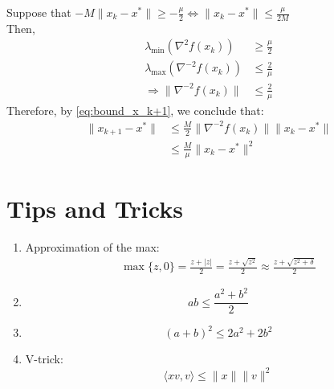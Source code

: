 \documentclass[12pt, openany]{report}
\theoremstyle{definition}
\begin{document}
Suppose that $-M \|x_k-x^*\| \geq - \frac{\mu}{2} \Leftrightarrow \|x_k-x^*\| \leq \frac{\mu}{2M}$\\
Then,
\begin{equation}
	\begin{aligned}
		\lambda_{\min}(\nabla^2 f(x_k)) &\geq \frac{\mu}{2}\\
		\lambda_{\max}(\nabla^{-2} f(x_k)) &\leq \frac{2}{\mu}\\
		\Rightarrow \|\nabla^{-2} f(x_k)\| &\leq \frac{2}{\mu}
	\end{aligned}
\end{equation}
Therefore, by \eqref{eq:bound_x_k+1}, we conclude that:
\begin{equation}
	\begin{aligned}
		\|x_{k+1}-x^*\| &\leq \frac{M}{2}\|\nabla^{-2}f(x_k)\|\|x_k-x^*\|\\
		&\leq \frac{M}{\mu}\|x_k-x^*\|^2
	\end{aligned}
\end{equation}


\chapter{Tips and Tricks}\label{chap:tricks}
\begin{enumerate}
	\item Approximation of the max:
	\begin{equation}\label{eq:approx_max}
		\begin{aligned}
			\max\{z,0\} = \frac{z+|z|}{2} = \frac{z + \sqrt{z^2}}{2} \approx \frac{z + \sqrt{z^2 + \delta}}{2}
		\end{aligned}	
	\end{equation}
	\item \begin{equation}\label{eq:sq1}
		ab \leq \frac{a^2+b^2}{2}	
	\end{equation}
	\item \begin{equation}\label{eq:sq2}
		(a+b)^2 \leq 2a^2+2b^2
	\end{equation}
	\item V-trick:
	\begin{equation}\label{eq:vtrick}
		\langle xv,v\rangle \leq \|x\|\|v\|^2
	\end{equation}
\end{enumerate}
\end{document}
